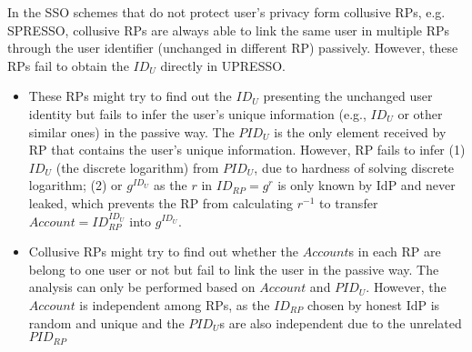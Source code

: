 In the SSO schemes that do not protect user's privacy form collusive RPs, e.g. SPRESSO, collusive RPs are always able to link the same user in multiple RPs through the user identifier (unchanged in different RP) passively. However, these RPs fail to obtain the $ID_U$ directly in UPRESSO.
\begin{itemize}
\item These RPs might try to find out the $ID_U$ presenting the unchanged user identity but fails to infer the user's unique information (e.g., $ID_U$ or other similar ones) in the passive way. The $PID_U$ is the only element received by RP that contains the user's unique information. However, RP fails to infer (1) $ID_U$ (the discrete logarithm) from $PID_U$, due to hardness of solving discrete logarithm; (2) or $g^{ID_U}$ as the $r$ in $ID_{RP}=g^r$ is only known by IdP and never leaked, which prevents the RP from calculating $r^{-1}$ to transfer $Account=ID_{RP}^{ID_U}$ into  $g^{ID_U}$.
\item Collusive RPs might try to find out whether the $Account$s in each RP are belong to one user or not but fail to link the user in the passive way. The analysis can only be performed based on $Account$ and $PID_U$. However, the $Account$ is independent among RPs, as the $ID_{RP}$ chosen by honest IdP is random and unique and the $PID_U$s are  also independent due to the unrelated $PID_{RP}$
\end{itemize}

